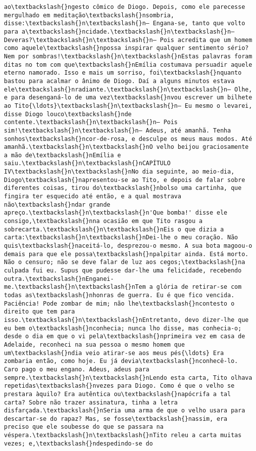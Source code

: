 \begin{Verbatim}[commandchars=\\\{\}]
ao\textbackslash{}ngesto cômico de Diogo. Depois, como ele parecesse mergulhado em meditação\textbackslash{}nsombria, disse:\textbackslash{}n\textbackslash{}n— Engana-se, tanto que volto para a\textbackslash{}ncidade.\textbackslash{}n\textbackslash{}n— Deveras?\textbackslash{}n\textbackslash{}n— Pois acredita que um homem como aquele\textbackslash{}npossa inspirar qualquer sentimento sério? Nem por sombras!\textbackslash{}n\textbackslash{}nEstas palavras foram ditas no tom com que\textbackslash{}nEmília costumava persuadir aquele eterno namorado. Isso e mais um sorriso, foi\textbackslash{}nquanto bastou para acalmar o ânimo de Diogo. Daí a alguns minutos estava ele\textbackslash{}nradiante.\textbackslash{}n\textbackslash{}n— Olhe, e para desenganá-lo de uma vez\textbackslash{}nvou escrever um bilhete ao Tito{\ldots}\textbackslash{}n\textbackslash{}n— Eu mesmo o levarei, disse Diogo louco\textbackslash{}nde contente.\textbackslash{}n\textbackslash{}n— Pois sim!\textbackslash{}n\textbackslash{}n— Adeus, até amanhã. Tenha sonhos\textbackslash{}ncor-de-rosa, e desculpe os meus maus modos. Até amanhã.\textbackslash{}n\textbackslash{}nO velho beijou graciosamente a mão de\textbackslash{}nEmília e saiu.\textbackslash{}n\textbackslash{}nCAPÍTULO IV\textbackslash{}n\textbackslash{}nNo dia seguinte, ao meio-dia, Diogo\textbackslash{}napresentou-se ao Tito, e depois de falar sobre diferentes coisas, tirou do\textbackslash{}nbolso uma cartinha, que fingira ter esquecido até então, e a qual mostrava não\textbackslash{}ndar grande apreço.\textbackslash{}n\textbackslash{}n'Que bomba!' disse ele consigo,\textbackslash{}nna ocasião em que Tito rasgou a sobrecarta.\textbackslash{}n\textbackslash{}nEis o que dizia a carta:\textbackslash{}n\textbackslash{}nDei-lhe o meu coração. Não quis\textbackslash{}naceitá-lo, desprezou-o mesmo. A sua bota magoou-o demais para que ele possa\textbackslash{}npalpitar ainda. Está morto. Não o censuro; não se deve falar de luz aos cegos;\textbackslash{}na culpada fui eu. Supus que pudesse dar-lhe uma felicidade, recebendo outra.\textbackslash{}nEnganei-me.\textbackslash{}n\textbackslash{}nTem a glória de retirar-se com todas as\textbackslash{}nhonras de guerra. Eu é que fico vencida. Paciência! Pode zombar de mim; não lhe\textbackslash{}ncontesto o direito que tem para isso.\textbackslash{}n\textbackslash{}nEntretanto, devo dizer-lhe que eu bem o\textbackslash{}nconhecia; nunca lho disse, mas conhecia-o; desde o dia em que o vi pela\textbackslash{}nprimeira vez em casa de Adelaide, reconheci na sua pessoa o mesmo homem que um\textbackslash{}ndia veio atirar-se aos meus pés{\ldots} Era zombaria então, como hoje. Eu já devia\textbackslash{}nconhecê-lo. Caro pago o meu engano. Adeus, adeus para sempre.\textbackslash{}n\textbackslash{}nLendo esta carta, Tito olhava repetidas\textbackslash{}nvezes para Diogo. Como é que o velho se prestara àquilo? Era autêntica ou\textbackslash{}napócrifa a tal carta? Sobre não trazer assinatura, tinha a letra disfarçada.\textbackslash{}nSeria uma arma de que o velho usara para descartar-se do rapaz? Mas, se fosse\textbackslash{}nassim, era preciso que ele soubesse do que se passara na véspera.\textbackslash{}n\textbackslash{}nTito releu a carta muitas vezes; e,\textbackslash{}ndespedindo-se do 
\end{Verbatim}
